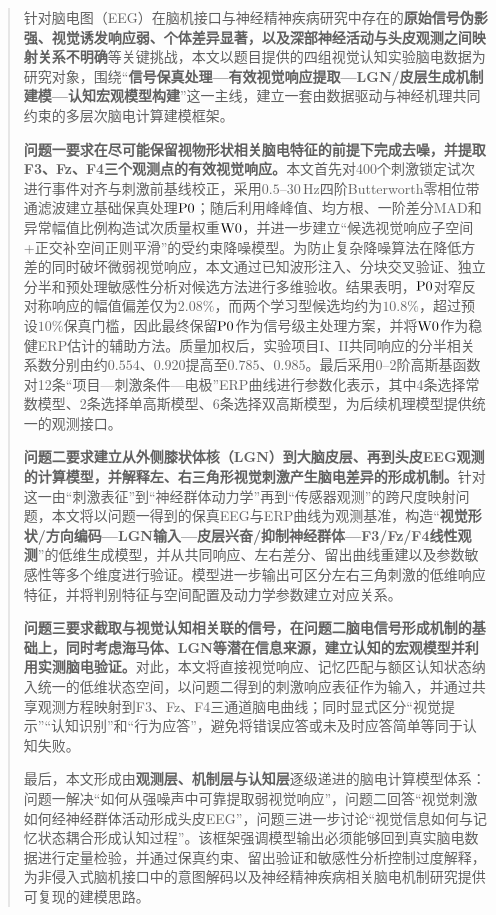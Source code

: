 \begin{abstract}

针对脑电图（EEG）在脑机接口与神经精神疾病研究中存在的\textbf{原始信号伪影强、视觉诱发响应弱、个体差异显著，以及深部神经活动与头皮观测之间映射关系不明确}等关键挑战，本文以题目提供的四组视觉认知实验脑电数据为研究对象，围绕“\textbf{信号保真处理—有效视觉响应提取—LGN/皮层生成机制建模—认知宏观模型构建}”这一主线，建立一套由数据驱动与神经机理共同约束的多层次脑电计算建模框架。

\textbf{问题一要求在尽可能保留视物形状相关脑电特征的前提下完成去噪，并提取F3、Fz、F4三个观测点的有效视觉响应。}本文首先对400个刺激锁定试次进行事件对齐与刺激前基线校正，采用$0.5$--$30\,\mathrm{Hz}$四阶Butterworth零相位带通滤波建立基础保真处理$\Pzero$；随后利用峰峰值、均方根、一阶差分MAD和异常幅值比例构造试次质量权重$\Wzero$，并进一步建立“候选视觉响应子空间+正交补空间正则平滑”的受约束降噪模型。为防止复杂降噪算法在降低方差的同时破坏微弱视觉响应，本文通过已知波形注入、分块交叉验证、独立分半和预处理敏感性分析对候选方法进行多维验收。结果表明，$\Pzero$对窄反对称响应的幅值偏差仅为$2.08\%$，而两个学习型候选均约为$10.8\%$，超过预设$10\%$保真门槛，因此最终保留$\Pzero$作为信号级主处理方案，并将$\Wzero$作为稳健ERP估计的辅助方法。质量加权后，实验项目I、II共同响应的分半相关系数分别由约$0.554$、$0.920$提高至$0.785$、$0.985$。最后采用$0$--$2$阶高斯基函数对12条“项目—刺激条件—电极”ERP曲线进行参数化表示，其中4条选择常数模型、2条选择单高斯模型、6条选择双高斯模型，为后续机理模型提供统一的观测接口。

\textbf{问题二要求建立从外侧膝状体核（LGN）到大脑皮层、再到头皮EEG观测的计算模型，并解释左、右三角形视觉刺激产生脑电差异的形成机制。}针对这一由“刺激表征”到“神经群体动力学”再到“传感器观测”的跨尺度映射问题，本文将以问题一得到的保真EEG与ERP曲线为观测基准，构造“\textbf{视觉形状/方向编码—LGN输入—皮层兴奋/抑制神经群体—F3/Fz/F4线性观测}”的低维生成模型，并从共同响应、左右差分、留出曲线重建以及参数敏感性等多个维度进行验证。模型进一步输出可区分左右三角刺激的低维响应特征，并将判别特征与空间配置及动力学参数建立对应关系。

\textbf{问题三要求截取与视觉认知相关联的信号，在问题二脑电信号形成机制的基础上，同时考虑海马体、LGN等潜在信息来源，建立认知的宏观模型并利用实测脑电验证。}对此，本文将直接视觉响应、记忆匹配与额区认知状态纳入统一的低维状态空间，以问题二得到的刺激响应表征作为输入，并通过共享观测方程映射到F3、Fz、F4三通道脑电曲线；同时显式区分“视觉提示”“认知识别”和“行为应答”，避免将错误应答或未及时应答简单等同于认知失败。

最后，本文形成由\textbf{观测层、机制层与认知层}逐级递进的脑电计算模型体系：问题一解决“如何从强噪声中可靠提取弱视觉响应”，问题二回答“视觉刺激如何经神经群体活动形成头皮EEG”，问题三进一步讨论“视觉信息如何与记忆状态耦合形成认知过程”。该框架强调模型输出必须能够回到真实脑电数据进行定量检验，并通过保真约束、留出验证和敏感性分析控制过度解释，为非侵入式脑机接口中的意图解码以及神经精神疾病相关脑电机制研究提供可复现的建模思路。


\end{abstract}

